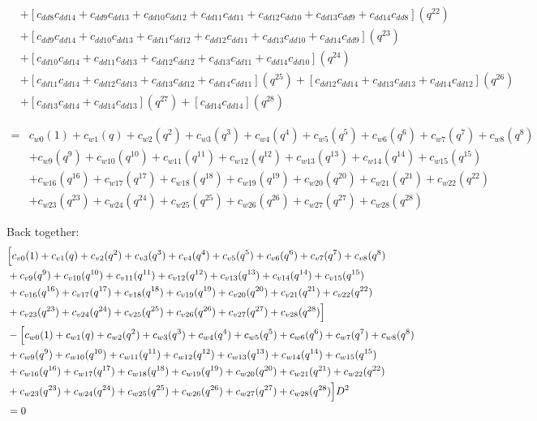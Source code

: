 \documentclass[12pt]{article}
\begin{document}
\begin{align}
    &+ [c_{dd8}c_{dd14} + c_{dd9}c_{dd13} + c_{dd10}c_{dd12} + c_{dd11}c_{dd11} + c_{dd12}c_{dd10} + c_{dd13}c_{dd9} + c_{dd14}c_{dd8}](q^{22}) \nonumber\\
    &+ [c_{dd9}c_{dd14} + c_{dd10}c_{dd13} + c_{dd11}c_{dd12} + c_{dd12}c_{dd11} + c_{dd13}c_{dd10} + c_{dd14}c_{dd9}](q^{23}) \nonumber\\
    &+ [c_{dd10}c_{dd14} + c_{dd11}c_{dd13} + c_{dd12}c_{dd12} + c_{dd13}c_{dd11} + c_{dd14}c_{dd10}](q^{24}) \nonumber\\
    &+ [c_{dd11}c_{dd14} + c_{dd12}c_{dd13} + c_{dd13}c_{dd12} + c_{dd14}c_{dd11}](q^{25}) + [c_{dd12}c_{dd14} + c_{dd13}c_{dd13} + c_{dd14}c_{dd12}](q^{26}) \nonumber\\
    &+ [c_{dd13}c_{dd14} + c_{dd14}c_{dd13}](q^{27}) + [c_{dd14}c_{dd14}](q^{28})
\end{align}

\begin{align}
    =& c_{w0}(1) + c_{w1}(q) + c_{w2}(q^2) + c_{w3}(q^3) + c_{w4}(q^4) + c_{w5}(q^5) + c_{w6}(q^6) + c_{w7}(q^7) + c_{w8}(q^8) \nonumber\\
    &+ c_{w9}(q^9) + c_{w10}(q^{10}) + c_{w11}(q^{11}) + c_{w12}(q^{12}) + c_{w13}(q^{13}) + c_{w14}(q^{14}) + c_{w15}(q^{15}) \nonumber\\
    &+ c_{w16}(q^{16}) + c_{w17}(q^{17}) + c_{w18}(q^{18}) + c_{w19}(q^{19}) + c_{w20}(q^{20}) + c_{w21}(q^{21}) + c_{w22}(q^{22}) \nonumber\\
    &+ c_{w23}(q^{23}) + c_{w24}(q^{24}) + c_{w25}(q^{25}) + c_{w26}(q^{26}) + c_{w27}(q^{27}) + c_{w28}(q^{28})
\end{align}

Back together:
\begin{align}
    &\Bigl[  c_{v0}(1) + c_{v1}(q) + c_{v2}(q^2) + c_{v3}(q^3) + c_{v4}(q^4) + c_{v5}(q^5) + c_{v6}(q^6) + c_{v7}(q^7) + c_{v8}(q^8) \nonumber\\
    &+ c_{v9}(q^9) + c_{v10}(q^{10}) + c_{v11}(q^{11}) + c_{v12}(q^{12}) + c_{v13}(q^{13}) + c_{v14}(q^{14}) + c_{v15}(q^{15}) \nonumber\\
    &+ c_{v16}(q^{16})+ c_{v17}(q^{17}) + c_{v18}(q^{18}) + c_{v19}(q^{19}) + c_{v20}(q^{20}) + c_{v21}(q^{21}) + c_{v22}(q^{22}) \nonumber\\
    &+ c_{v23}(q^{23}) + c_{v24}(q^{24}) + c_{v25}(q^{25}) + c_{v26}(q^{26}) + c_{v27}(q^{27}) + c_{v28}(q^{28}) \Bigr] \nonumber\\
    &- \Bigl[  c_{w0}(1) + c_{w1}(q) + c_{w2}(q^2) + c_{w3}(q^3) + c_{w4}(q^4) + c_{w5}(q^5) + c_{w6}(q^6) + c_{w7}(q^7) + c_{w8}(q^8) \nonumber\\
    &+ c_{w9}(q^9) + c_{w10}(q^{10}) + c_{w11}(q^{11}) + c_{w12}(q^{12}) + c_{w13}(q^{13}) + c_{w14}(q^{14}) + c_{w15}(q^{15}) \nonumber\\
    &+ c_{w16}(q^{16}) + c_{w17}(q^{17}) + c_{w18}(q^{18}) + c_{w19}(q^{19}) + c_{w20}(q^{20}) + c_{w21}(q^{21}) + c_{w22}(q^{22}) \nonumber\\
    &+ c_{w23}(q^{23}) + c_{w24}(q^{24}) + c_{w25}(q^{25}) + c_{w26}(q^{26}) + c_{w27}(q^{27}) + c_{w28}(q^{28}) \Bigr]D^2  \nonumber\\
    &= 0
\end{align}
\end{document}
